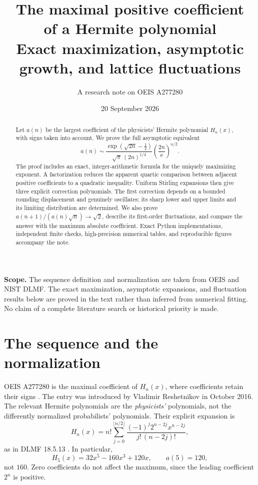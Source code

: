 \documentclass[11pt,letterpaper]{article}
\title{The maximal positive coefficient\\of a Hermite polynomial\\[0.45em]
\large Exact maximization, asymptotic growth, and lattice fluctuations}
\author{A research note on OEIS A277280}
\date{20 September 2026}
\theoremstyle{remark}
\newcommand{\ee}{\mathrm{e}}
\begin{document}
\maketitle
\thispagestyle{empty}
\begin{abstract}
Let $a(n)$ be the largest coefficient of the physicists' Hermite polynomial
$H_n(x)$, with signs taken into account. We prove the full asymptotic equivalent
\[
\boxed{\displaystyle
 a(n)\sim
 \frac{\exp(\sqrt{2n}-\tfrac12)}{\sqrt{\pi}\,(2n)^{1/4}}
 \left(\frac{2n}{\ee}\right)^{n/2}.}
\]
The proof includes an exact, integer-arithmetic formula for the uniquely
maximizing exponent. A factorization reduces the apparent quartic comparison
between adjacent positive coefficients to a quadratic inequality. Uniform
Stirling expansions then give three explicit correction polynomials. The
first correction depends on a bounded rounding displacement and genuinely
oscillates; its sharp lower and upper limits and its limiting distribution
are determined. We also prove $a(n+1)/(a(n)\sqrt n)\to\sqrt2$, describe its
first-order fluctuations, and compare the answer with the maximum absolute
coefficient. Exact Python implementations, independent finite checks,
high-precision numerical tables, and reproducible figures accompany the note.
\end{abstract}

\vfill
\small
\textbf{Scope.} The sequence definition and normalization are taken from
OEIS and NIST DLMF. The exact maximization, asymptotic expansions, and
fluctuation results below are proved in the text rather than inferred from
numerical fitting. No claim of a complete literature search or historical
priority is made.
\normalsize
\newpage
\tableofcontents
\newpage

\section{The sequence and the normalization}

OEIS A277280 is the maximal coefficient of $H_n(x)$, where coefficients
retain their signs \cite{oeis280}. The entry was introduced by Vladimir
Reshetnikov in October 2016. The relevant Hermite polynomials are the
\emph{physicists'} polynomials, not the differently normalized
probabilists' polynomials. Their explicit expansion is
\begin{equation}\label{eq:hermite}
 H_n(x)=n!\sum_{j=0}^{\lfloor n/2\rfloor}
 \frac{(-1)^j 2^{n-2j}x^{n-2j}}{j!\,(n-2j)!},
\end{equation}
as in DLMF 18.5.13 \cite{dlmfhermite}. In particular,
\[
 H_5(x)=32x^5-160x^3+120x,
 \qquad a(5)=120,
\]
not $160$. Zero coefficients do not affect the maximum, since the leading
coefficient $2^n$ is positive.
\end{document}

